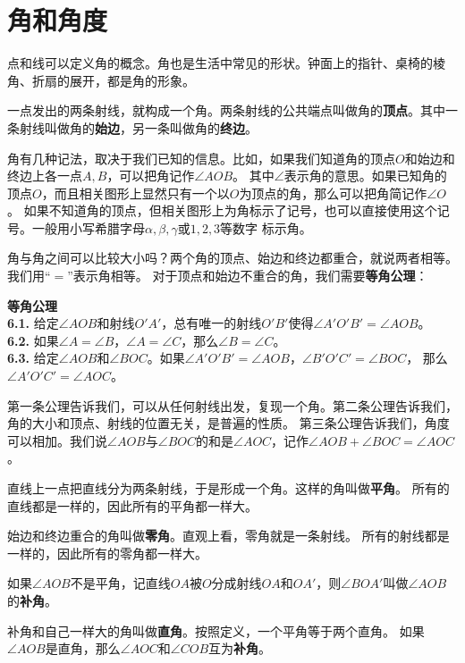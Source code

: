 \documentclass[12pt,UTF8,fontset=none]{ctexbook}
\begin{document}
\section{角和角度}
点和线可以定义角的概念。角也是生活中常见的形状。钟面上的指针、桌椅的棱角、折扇的展开，都是角的形象。

一点发出的两条射线，就构成一个角。两条射线的公共端点叫做角的\textbf{顶点}。其中一条射线叫做角的\textbf{始边}，另一条叫做角的\textbf{终边}。

角有几种记法，取决于我们已知的信息。比如，如果我们知道角的顶点$O$和始边和终边上各一点$A,B$，可以把角记作$\angle AOB$。
其中$\angle$表示角的意思。如果已知角的顶点$O$，而且相关图形上显然只有一个以$O$为顶点的角，那么可以把角简记作$\angle O$。
如果不知道角的顶点，但相关图形上为角标示了记号，也可以直接使用这个记号。一般用小写希腊字母$\alpha, \beta, \gamma$或$1,2,3$等数字
标示角。

角与角之间可以比较大小吗？两个角的顶点、始边和终边都重合，就说两者相等。我们用“$=$”表示角相等。
对于顶点和始边不重合的角，我们需要\textbf{等角公理}：
\begin{po}{\textbf{等角公理}}\label{po:5}
    \mbox{}\\
    \indent \textbf{6.1.} 给定$\angle AOB$和射线$O'A'$，总有唯一的射线$O'B'$使得$\angle A'O'B' = \angle AOB$。\\
    \indent \textbf{6.2.} 如果$\angle A = \angle B$，$\angle A = \angle C$，那么$\angle B = \angle C$。\\
    \indent \textbf{6.3.} 给定$\angle AOB$和$\angle BOC$。如果$\angle A'O'B' = \angle AOB$，$\angle B'O'C' = \angle BOC$，
    那么$\angle A'O'C' = \angle AOC$。
\end{po}
第一条公理告诉我们，可以从任何射线出发，复现一个角。第二条公理告诉我们，角的大小和顶点、射线的位置无关，是普遍的性质。
第三条公理告诉我们，角度可以相加。我们说$\angle AOB$与$\angle BOC$的和是$\angle AOC$，记作$\angle AOB + \angle BOC = \angle AOC$。

直线上一点把直线分为两条射线，于是形成一个角。这样的角叫做\textbf{平角}。
所有的直线都是一样的，因此所有的平角都一样大。

始边和终边重合的角叫做\textbf{零角}。直观上看，零角就是一条射线。
所有的射线都是一样的，因此所有的零角都一样大。

如果$\angle AOB$不是平角，记直线$OA$被$O$分成射线$OA$和$OA'$，则$\angle BOA'$叫做$\angle AOB$的\textbf{补角}。

补角和自己一样大的角叫做\textbf{直角}。按照定义，一个平角等于两个直角。
如果$\angle AOB$是直角，那么$\angle AOC$和$\angle COB$互为\textbf{补角}。
\end{document}
